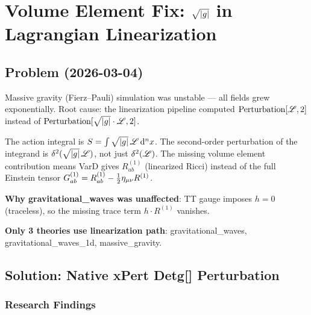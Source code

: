 
\section{Volume Element Fix: \texorpdfstring{$\sqrt{|g|}$}{sqrt|g|} in Lagrangian Linearization}
\label{sec:volume-element-fix}

\subsection{Problem (2026-03-04)}
\label{sec:vol-problem}

Massive gravity (Fierz--Pauli) simulation was unstable --- all fields grew exponentially. Root cause: the linearization pipeline computed $\text{Perturbation}[\mathscr{L}, 2]$ instead of $\text{Perturbation}[\sqrt{|g|} \cdot \mathscr{L}, 2]$.

The action integral is $S = \int \sqrt{|g|}\, \mathscr{L}\, \mathrm{d}^n x$. The second-order perturbation of the integrand is $\delta^2(\sqrt{|g|}\, \mathscr{L})$, not just $\delta^2(\mathscr{L})$. The missing volume element contribution means VarD gives $R^{(1)}_{ab}$ (linearized Ricci) instead of the full Einstein tensor $G^{(1)}_{ab} = R^{(1)}_{ab} - \tfrac{1}{2}\eta_{\mu\nu} R^{(1)}$.

\textbf{Why gravitational\_waves was unaffected}: TT gauge imposes $h = 0$ (traceless), so the missing trace term $h \cdot R^{(1)}$ vanishes.

\textbf{Only 3 theories use linearization path}: gravitational\_waves, gravitational\_waves\_1d, massive\_gravity.


\subsection{Solution: Native xPert Detg[] Perturbation}
\label{sec:vol-solution}

\subsubsection{Research Findings}

